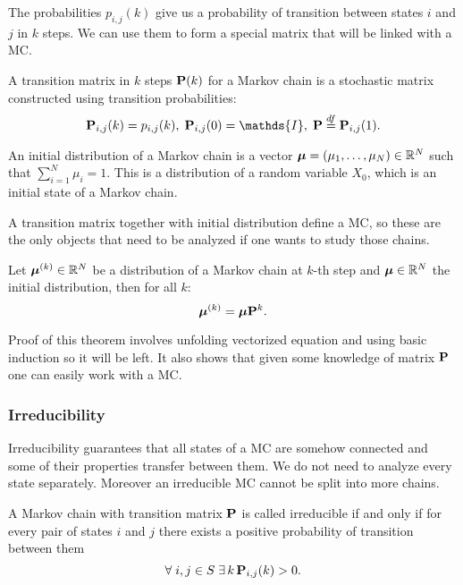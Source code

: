 	The probabilities $p_{i,j}(k)$ give us a probability of transition between states $i$ and $j$ in $k$  steps. We can use them to form a special matrix that will be linked with a MC.
	\begin{definition}
		A transition matrix in $k$ steps $\mathbf{P}(k)$ for a Markov chain is a stochastic matrix constructed using transition probabilities:
		\begin{equation*}
			\PP_{i,j}(k) = p_{i,j}(k), \; \PP_{i,j}(0) = \mathds{I}, \; \PP \overset{df}{=} \PP_{i,j}(1).
		\end{equation*}
	\end{definition}
	
	\begin{definition}
		An initial distribution of a Markov chain is a vector $\bm{\mu} = (\mu_1, \ldots, \mu_N) \in \mathbb{R}^N$ such that $\sum_{i=1}^{N} \mu_i = 1$. This is a distribution of a random variable $X_0$, which is an initial state of a Markov chain.
	\end{definition}

	A transition matrix together with initial distribution define a MC, so these are the only objects that need to be analyzed if one wants to study those chains.
	
	\begin{theorem}
		Let $\bm{\mu}^{(k)} \in \mathbb{R}^N$ be a distribution of a Markov chain at $k$-th step and $\bm{\mu} \in \mathbb{R}^N$ the initial distribution, then for all $k$:
		\begin{equation*}
			\bm{\mu}^{(k)} = \bm{\mu} \mathbf{P}^k.
		\end{equation*}
	\end{theorem}
	Proof of this theorem involves unfolding vectorized equation and using basic induction so it will be left. It also shows that given some knowledge of matrix $\mathbf{P}$ one can easily work with a MC.
	
	\subsubsection{Irreducibility}
		Irreducibility guarantees that all states of a MC are somehow connected and some of their properties transfer between them. We do not need to analyze every state separately. Moreover an irreducible MC cannot be split into more chains.
		\begin{definition}[Irreducibility]
			A Markov chain with transition matrix $\mathbf{P}$ is called irreducible if and only if for every pair of states $i$ and $j$ there exists a positive probability of transition between them \ie
			\begin{equation*}
				\forall \; i,j \in S \; \exists \, k \, \mathbf{P}_{i,j}(k) > 0.
			\end{equation*}
		\end{definition}
	
